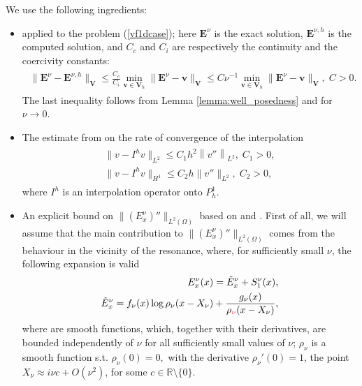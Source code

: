 We use the following ingredients:
\begin{itemize}
 \item {} applied to the problem (\ref{vf1dcase}); here $\mathbf{E}^{\nu}$ is the exact solution, 
 $\mathbf{E}^{\nu,h}$ is the computed solution, and $C_c$ and $C_i$ are respectively the continuity and the coercivity constants:
\begin{align}
\label{eq:cea}
\begin{split}
 \|\mathbf{E}^{\nu}-\mathbf{E}^{\nu,h}\|_{\mathbf{V}}\leq \frac{C_c}{C_i}\min_{\mathbf{v}\in \mathbf{V}_h}\|\mathbf{E}^{\nu}-\mathbf{v}\|_{\mathbf{V}}
 \leq C\nu^{-1}\min_{\mathbf{v}\in \mathbf{V}_h}\|\mathbf{E}^{\nu}-\mathbf{v}\|_{\mathbf{V}},\; C>0.
 \end{split}
\end{align}
The last inequality follows from Lemma \ref{lemma:well_posedness} and  for $\nu\rightarrow 0$.   
\item The estimate from \cite[Chapter 0]{brenner} on the rate of convergence of the interpolation 
\begin{align}
\label{eq:interp}
\begin{split}
 \|v-I^{h}v\|_{L^2}\leq C_1h^2\left\|v''\right\|_{L^2},\; C_1>0,\\
 \|v-I^{h}v\|_{H^1}\leq C_2h\|v''\|_{L^2},\; C_2>0, 
 \end{split}
\end{align}
where $I^{h}$ is an interpolation operator onto $P_{h}^{1}$. 
\item An explicit bound on $\|\left(E_{x}^{\nu}\right)''\|_{L^{2}(\Omega)}$ based on \cite{Despres_2014} and \cite[Proposition 1]{singular_solutions}. 
First of all, we 
will assume that the main contribution to $\|\left(E_{x}^{\nu}\right)''\|_{L^{2}(\Omega)}$ comes from the behaviour in the vicinity of the resonance, where, 
for sufficiently small $\nu$, the following expansion is valid \cite[Proposition 1]{singular_solutions}
\begin{align}
\begin{split}
\label{eq:exact}
 E_x^{\nu}(x)=\tilde{E}_x^{\nu}+S_{1}^{\nu}(x),\\
 \tilde{E}_x^{\nu}=f_{\nu}(x)\log\rho_{\nu}(x-X_{\nu})+\frac{g_{\nu}(x)}{\rho\lastrev{_{\nu}}(x-X_{\nu})},
 \end{split}
\end{align}
where  are smooth functions, 
which, together with their derivatives, are bounded independently of $\nu$ for all sufficiently small values of $\nu$; 
$\rho_{\nu}$ is a smooth function s.t. $\rho_{\nu}(0)=0,$ with the derivative $\rho_{\nu}'(0)=1$, 
the point $X_{\nu}\approx i\nu c+O(\nu^2)$, for some $c\in\mathbb{R}\setminus\{0\}$. 


\end{itemize}

